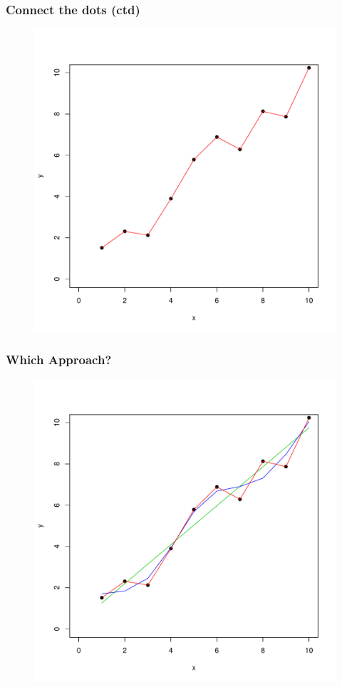 \documentclass[xcolor=x11names,compress]{beamer}\usepackage[]{graphicx}\usepackage[]{color}
\newenvironment{knitrout}{}{} %
\begin{document}
\begin{frame}[plain]
  \frametitle{Connect the dots (ctd)}
\begin{figure}
\centering
\begin{knitrout}\tiny
{}\color{fgcolor}

{\centering \includegraphics[width=.6\linewidth]{figure/beamer-unnamed-chunk-43-1} 

}



\end{knitrout}
\end{figure}
\end{frame}
\begin{frame}[plain]
  \frametitle{Which Approach?}
\begin{figure}
\centering
\begin{knitrout}\tiny
{}\color{fgcolor}

{\centering \includegraphics[width=.6\linewidth]{figure/beamer-unnamed-chunk-44-1} 

}



\end{knitrout}
\end{figure}
\end{frame}
\end{document}
